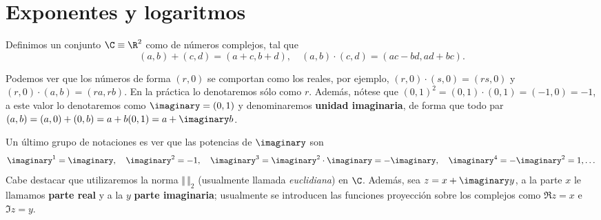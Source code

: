 \documentclass[11pt,oneside,a4paper]{book}
\begin{document}
\section{Exponentes y logaritmos}
\begin{mydef}
Definimos un conjunto $\C\equiv\R^2$ como de números complejos, tal que
$$(a,b)+(c,d)=(a+c,b+d),\quad (a,b)\cdot(c,d)=(ac-bd,ad+bc).$$ 
\end{mydef}
Podemos ver que los números de forma $(r,0)$ se comportan como los reales, por ejemplo, $(r,0)\cdot(s,0)=(rs,0)$ y $(r,0)\cdot(a,b)=(ra,rb)$. En la práctica lo denotaremos sólo como $r$. Además, nótese que $(0,1)^2=(0,1)\cdot(0,1)=(-1,0)=-1$, a este valor lo denotaremos como $\imaginary=(0,1)$ y denominaremos \textbf{unidad imaginaria}, de forma que todo par $(a,b)=(a,0)+(0,b)=a+b(0,1)=a+\imaginary b$.

Un último grupo de notaciones es ver que las potencias de $\imaginary$ son
$$\imaginary^1=\imaginary,\quad \imaginary^2=-1,\quad \imaginary^3=\imaginary^2\cdot\imaginary=-\imaginary,\quad \imaginary^4=-\imaginary^2=1,\dots$$
Cabe destacar que utilizaremos la norma $\Vert\,\Vert_2$ (usualmente llamada \textit{euclidiana}) en $\C$. Además, sea $z=x+\imaginary y$, a la parte $x$ le llamamos \textbf{parte real} y a la $y$ \textbf{parte imaginaria}; usualmente se introducen las funciones proyección sobre los complejos como $\Re z=x$ e $\Im z=y$.
\end{document}
